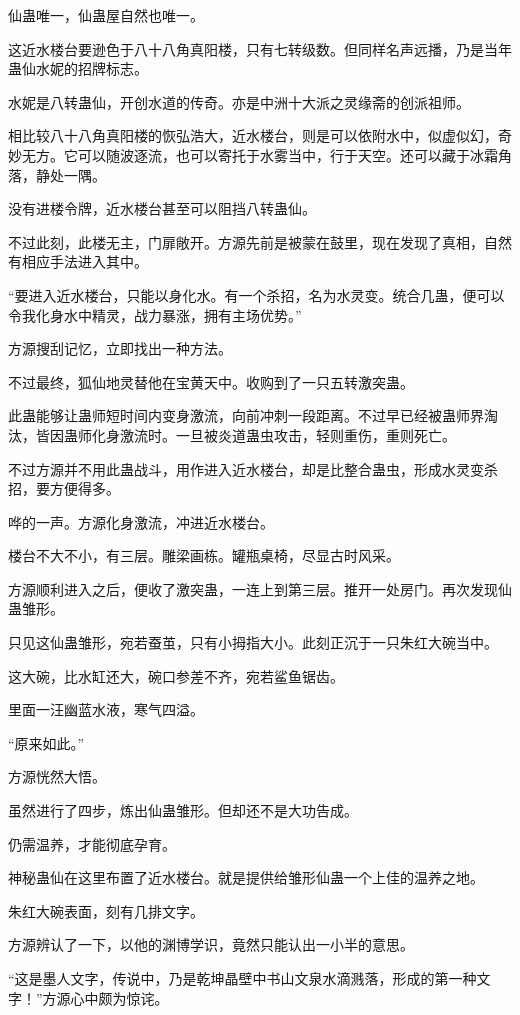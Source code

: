 \begin{this_body}
仙蛊唯一，仙蛊屋自然也唯一。

这近水楼台要逊色于八十八角真阳楼，只有七转级数。但同样名声远播，乃是当年蛊仙水妮的招牌标志。

水妮是八转蛊仙，开创水道的传奇。亦是中洲十大派之灵缘斋的创派祖师。

相比较八十八角真阳楼的恢弘浩大，近水楼台，则是可以依附水中，似虚似幻，奇妙无方。它可以随波逐流，也可以寄托于水雾当中，行于天空。还可以藏于冰霜角落，静处一隅。

没有进楼令牌，近水楼台甚至可以阻挡八转蛊仙。

不过此刻，此楼无主，门扉敞开。方源先前是被蒙在鼓里，现在发现了真相，自然有相应手法进入其中。

“要进入近水楼台，只能以身化水。有一个杀招，名为水灵变。统合几蛊，便可以令我化身水中精灵，战力暴涨，拥有主场优势。”

方源搜刮记忆，立即找出一种方法。

不过最终，狐仙地灵替他在宝黄天中。收购到了一只五转激突蛊。

此蛊能够让蛊师短时间内变身激流，向前冲刺一段距离。不过早已经被蛊师界淘汰，皆因蛊师化身激流时。一旦被炎道蛊虫攻击，轻则重伤，重则死亡。

不过方源并不用此蛊战斗，用作进入近水楼台，却是比整合蛊虫，形成水灵变杀招，要方便得多。

哗的一声。方源化身激流，冲进近水楼台。

楼台不大不小，有三层。雕梁画栋。罐瓶桌椅，尽显古时风采。

方源顺利进入之后，便收了激突蛊，一连上到第三层。推开一处房门。再次发现仙蛊雏形。

只见这仙蛊雏形，宛若蚕茧，只有小拇指大小。此刻正沉于一只朱红大碗当中。

这大碗，比水缸还大，碗口参差不齐，宛若鲨鱼锯齿。

里面一汪幽蓝水液，寒气四溢。

“原来如此。”

方源恍然大悟。

虽然进行了四步，炼出仙蛊雏形。但却还不是大功告成。

仍需温养，才能彻底孕育。

神秘蛊仙在这里布置了近水楼台。就是提供给雏形仙蛊一个上佳的温养之地。

朱红大碗表面，刻有几排文字。

方源辨认了一下，以他的渊博学识，竟然只能认出一小半的意思。

“这是墨人文字，传说中，乃是乾坤晶壁中书山文泉水滴溅落，形成的第一种文字！”方源心中颇为惊诧。


\end{this_body}
